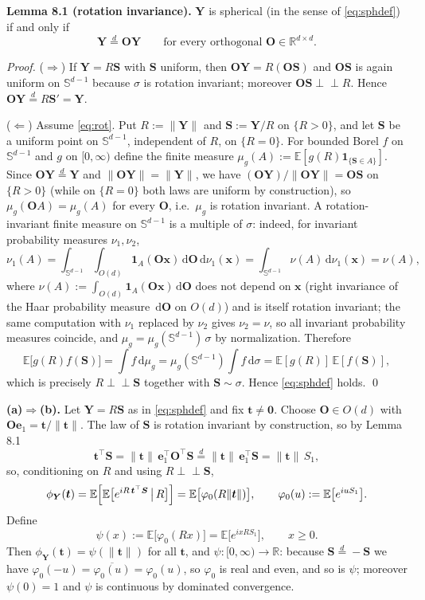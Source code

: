 \documentclass{MFM-hw} %
\newcommand{\real}{\mathbb{R}}
\newcommand{\dd}{\,\mathrm{d}}
\newcommand{\E}{\mathbb{E}}
\newcommand{\inde}{\perp\!\!\!\perp}
\newcommand{\bY}{\bm{Y}}
\newcommand{\bS}{\bm{S}}
\newcommand{\bx}{\bm{x}}
\newcommand{\bt}{\bm{t}}
\newcommand{\be}{\bm{e}}
\newcommand{\bO}{\bm{O}}
\newcommand{\bzero}{\bm{0}}
\begin{document}
\smallskip
\noindent\textbf{Lemma 8.1 (rotation invariance).} $\bY$ is spherical (in the sense of \eqref{eq:sphdef}) if and only if
\begin{equation}\label{eq:rot}
    \bY\overset{d}{=}\bO\bY\qquad\text{for every orthogonal }\bO\in\real^{d\times d}.
\end{equation}

\emph{Proof.} ($\Rightarrow$) If $\bY=R\bS$ with $\bS$ uniform, then $\bO\bY=R(\bO\bS)$ and $\bO\bS$ is again uniform on $\mathbb{S}^{d-1}$ because $\sigma$ is rotation invariant; moreover $\bO\bS\inde R$. Hence $\bO\bY\overset{d}{=}R\bS'=\bY$.

($\Leftarrow$) Assume \eqref{eq:rot}. Put $R:=\|\bY\|$ and $\bS:=\bY/R$ on $\{R>0\}$, and let $\bS$ be a uniform point on $\mathbb{S}^{d-1}$, independent of $R$, on $\{R=0\}$. For bounded Borel $f$ on $\mathbb{S}^{d-1}$ and $g$ on $[0,\infty)$ define the finite measure $\mu_g(A):=\E[g(R)\mathbf{1}_{\{\bS\in A\}}]$. Since $\bO\bY\overset{d}{=}\bY$ and $\|\bO\bY\|=\|\bY\|$, we have $(\bO\bY)/\|\bO\bY\|=\bO\bS$ on $\{R>0\}$ (while on $\{R=0\}$ both laws are uniform by construction), so $\mu_g(\bO A)=\mu_g(A)$ for every $\bO$, i.e.\ $\mu_g$ is rotation invariant. A rotation-invariant finite measure on $\mathbb{S}^{d-1}$ is a multiple of $\sigma$: indeed, for invariant probability measures $\nu_1,\nu_2$,
\[
    \nu_1(A)=\int_{\mathbb{S}^{d-1}}\int_{O(d)}\mathbf{1}_A(\bO\bx)\dd\bO\dd\nu_1(\bx)=\int_{\mathbb{S}^{d-1}}\nu(A)\dd\nu_1(\bx)=\nu(A),
\]
where $\nu(A):=\int_{O(d)}\mathbf{1}_A(\bO\bx)\dd\bO$ does not depend on $\bx$ (right invariance of the Haar probability measure $\dd\bO$ on $O(d)$) and is itself rotation invariant; the same computation with $\nu_1$ replaced by $\nu_2$ gives $\nu_2=\nu$, so all invariant probability measures coincide, and $\mu_g=\mu_g(\mathbb{S}^{d-1})\,\sigma$ by normalization. Therefore
\[
    \E\bigl[g(R)f(\bS)\bigr]=\int f\dd\mu_g=\mu_g(\mathbb{S}^{d-1})\int f\dd\sigma=\E[g(R)]\,\E[f(\bS)],
\]
which is precisely $R\inde\bS$ together with $\bS\sim\sigma$. Hence \eqref{eq:sphdef} holds. \qed

\smallskip
\noindent\textbf{(a)$\Rightarrow$(b).} Let $\bY=R\bS$ as in \eqref{eq:sphdef} and fix $\bt\ne\bzero$. Choose $\bO\in O(d)$ with $\bO\be_1=\bt/\|\bt\|$. The law of $\bS$ is rotation invariant by construction, so by Lemma 8.1
\[
    \bt^\top\bS=\|\bt\|\,\be_1^\top\bO^\top\bS\overset{d}{=}\|\bt\|\,\be_1^\top\bS=\|\bt\|\,S_1 ,
\]
so, conditioning on $R$ and using $R\inde\bS$,
\begin{equation}\label{eq:sphcf}
    \phi_{\bY}(\bt)=\E\Bigl[\E\bigl[e^{iR\,\bt^\top\bS}\,\big|\,R\bigr]\Bigr]
    =\E\bigl[\varphi_0(R\|\bt\|)\bigr],
    \qquad \varphi_0(u):=\E\bigl[e^{iuS_1}\bigr].
\end{equation}
Define
\begin{equation}\label{eq:gen}
    \psi(x):=\E\bigl[\varphi_0(Rx)\bigr]=\E\bigl[e^{ixR S_1}\bigr],\qquad x\ge0 .
\end{equation}
Then $\phi_{\bY}(\bt)=\psi(\|\bt\|)$ for all $\bt$, and $\psi:[0,\infty)\to\real$: because $\bS\overset{d}{=}-\bS$ we have $\varphi_0(-u)=\overline{\varphi_0(u)}=\varphi_0(u)$, so $\varphi_0$ is real and even, and so is $\psi$; moreover $\psi(0)=1$ and $\psi$ is continuous by dominated convergence.
\end{document}
